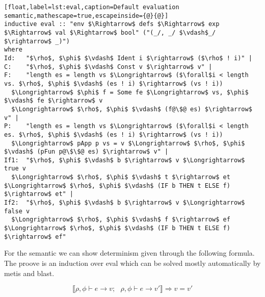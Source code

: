 \begin{lstlisting}[float,label=lst:eval,caption=Default evaluation semantic,mathescape=true,escapeinside={@}{@}]
inductive eval :: "env $\Rightarrow$ defs $\Rightarrow$ exp $\Rightarrow$ val $\Rightarrow$ bool" ("(_/, _/ $\vdash$_/ $\rightarrow$ _)")
where
Id:   "$\rho$, $\phi$ $\vdash$ Ident i $\rightarrow$ ($\rho$ ! i)" |
C:    "$\rho$, $\phi$ $\vdash$ Const v $\rightarrow$ v" |
F:    "length es = length vs $\Longrightarrow$ ($\forall$i < length vs. $\rho$, $\phi$ $\vdash$ (es ! i) $\rightarrow$ (vs ! i))
  $\Longrightarrow$ $\phi$ f = Some fe $\Longrightarrow$ vs, $\phi$ $\vdash$ fe $\rightarrow$ v
  $\Longrightarrow$ $\rho$, $\phi$ $\vdash$ (f@\$@ es) $\rightarrow$ v" |
P:    "length es = length vs $\Longrightarrow$ ($\forall$i < length es. $\rho$, $\phi$ $\vdash$ (es ! i) $\rightarrow$ (vs ! i))
  $\Longrightarrow$ pApp p vs = v $\Longrightarrow$ $\rho$, $\phi$ $\vdash$ (pFun p@\$\$@ es) $\rightarrow$ v" |
If1:  "$\rho$, $\phi$ $\vdash$ b $\rightarrow$ v $\Longrightarrow$ true v
  $\Longrightarrow$ $\rho$, $\phi$ $\vdash$ t $\rightarrow$ et $\Longrightarrow$ $\rho$, $\phi$ $\vdash$ (IF b THEN t ELSE f) $\rightarrow$ et" |
If2:  "$\rho$, $\phi$ $\vdash$ b $\rightarrow$ v $\Longrightarrow$ false v
  $\Longrightarrow$ $\rho$, $\phi$ $\vdash$ f $\rightarrow$ ef $\Longrightarrow$ $\rho$, $\phi$ $\vdash$ (IF b THEN t ELSE f) $\rightarrow$ ef"
\end{lstlisting}

For the semantic we can show determinism given through the following formula.
The proove is an induction over eval which can be solved mostly automatically by metis and blast.

\begin{equation*}
 \llbracket \rho, \phi \vdash e \rightarrow v; \text{ } \rho, \phi \vdash e \rightarrow v' \rrbracket \Longrightarrow v = v'
\end{equation*}
